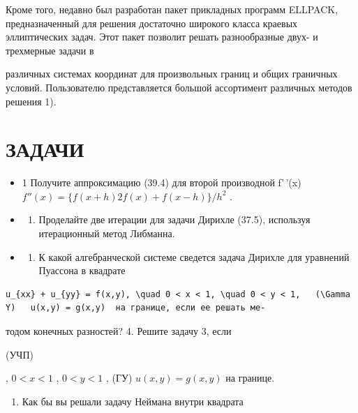 \documentclass[
  ukrainian,
]{article}
\providecommand{\tightlist}{%
  \setlength{\itemsep}{0pt}\setlength{\parskip}{0pt}}
\begin{document}
Кроме того, недавно был разработан пакет прикладных программ ELLPACK,
предназначенный для решения достаточно широкого класса краевых
эллиптических задач. Этот пакет позволит решать разнообразные двух- и
трехмерные задачи в

различных системах координат для произвольных границ и общих граничных
условий. Пользователю представляется большой ассортимент различных
методов решения 1).

\section{ЗАДАЧИ}\label{ux437ux430ux434ux430ux447ux438-6}

\begin{itemize}
\tightlist
\item
  1 Получите аппроксимацию (39.4) для второй производной f'\,'(x)
  \(f''(x) = \{f(x+h) 2f(x) + f(x-h)\}/h^2\) .
\item
  \begin{enumerate}
  \def\labelenumi{\arabic{enumi}.}
  \setcounter{enumi}{1}
  \tightlist
  \item
    Проделайте две итерации для задачи Дирихле (37.5), используя
    итерационный метод Либманна.
  \end{enumerate}
\item
  \begin{enumerate}
  \def\labelenumi{\arabic{enumi}.}
  \setcounter{enumi}{2}
  \tightlist
  \item
    К какой алгебранческой системе сведется задача Дирихле для уравнений
    Пуассона в квадрате
  \end{enumerate}
\end{itemize}

\begin{verbatim}
u_{xx} + u_{yy} = f(x,y), \quad 0 < x < 1, \quad 0 < y < 1,   (\Gamma Y)   u(x,y) = g(x,y)  на границе, если ее решать ме-
\end{verbatim}

тодом конечных разностей? 4. Решите задачу 3, если

(УЧП)

, \(0 < x < 1\) , \(0 < y < 1\) , (ГУ) \(u(x, y) = g(x, y)\) на границе.

\begin{enumerate}
\def\labelenumi{\arabic{enumi}.}
\setcounter{enumi}{4}
\tightlist
\item
  Как бы вы решали задачу Неймана внутри квадрата
\end{enumerate}
\end{document}

